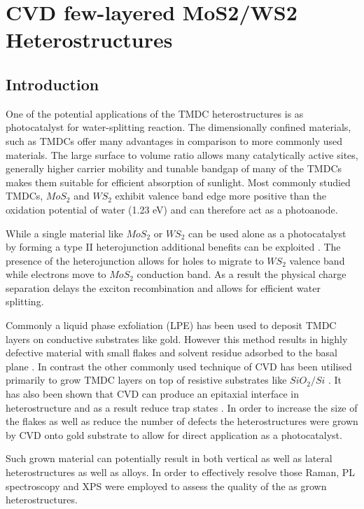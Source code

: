 \chapter{CVD few-layered MoS2/WS2 Heterostructures}
\label{cha:Heterostructures}

\section{Introduction}

One of the potential applications of the TMDC heterostructures is as photocatalyst for water-splitting reaction. The dimensionally confined materials, such as TMDCs offer many advantages in comparison to more commonly used materials. The large surface to volume ratio allows many catalytically active sites, generally higher carrier mobility and tunable bandgap of many of the TMDCs makes them suitable for efficient absorption of sunlight. Most commonly studied TMDCs, $MoS_2$ and $WS_2$ exhibit valence band edge more positive than the oxidation potential of water (1.23 eV) and can therefore act as a photoanode. 

While a single material like $MoS_2$ or $WS_2$ can be used alone as a photocatalyst by forming a type II heterojunction additional benefits can be exploited \cite{Chen2016}\cite{Wang2013}. The presence of the heterojunction allows for holes to migrate to $WS_2$ valence band while electrons move to $MoS_2$ conduction band. As a result the physical charge separation delays the exciton recombination and allows for efficient water splitting. 

Commonly a liquid phase exfoliation (LPE) has been used to deposit TMDC layers on conductive substrates like gold. However this method results in highly defective material with small flakes and solvent residue adsorbed to the basal plane \cite{Yu2017}\cite{Yu2016}\cite{Sivula2016}. In contrast the other commonly used technique of CVD has been utilised primarily to grow TMDC layers on top of resistive substrates like $SiO_2/Si$ \cite{Reale2017}. It has also been shown that CVD can produce an epitaxial interface in heterostructure and as a result reduce trap states \cite{Tan2018}. In order to increase the size of the flakes as well as reduce the number of defects the heterostructures were grown by CVD onto gold substrate to allow for direct application as a photocatalyst.

Such grown material can potentially result in both vertical as well as lateral heterostructures as well as alloys. In order to effectively resolve those Raman, PL spectroscopy and XPS were employed to assess the quality of the as grown heterostructures.

